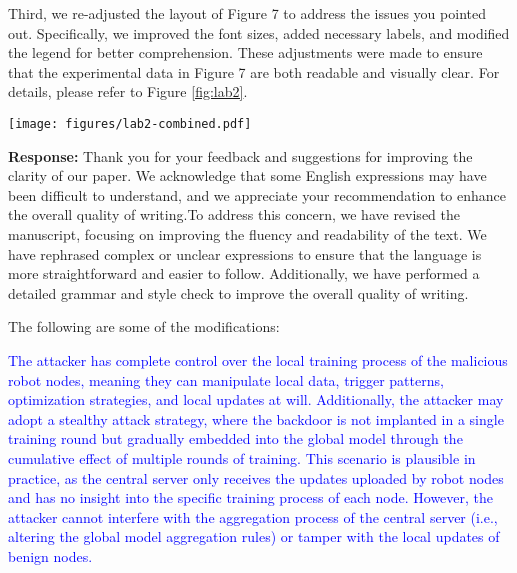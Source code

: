 \documentclass[a4paper,twoside,11pt,dvipsnames]{reviewresponse}
\begin{document}
Third, we re-adjusted the layout of Figure 7 to address the issues you pointed out. Specifically, we improved the font sizes, added necessary labels, and modified the legend for better comprehension. These adjustments were made to ensure that the experimental data in Figure 7 are both readable and visually clear. For details, please refer to Figure \ref{fig:lab2}.

\begin{figure*}[!h]
    \centering
    \texttt{[image: figures/lab2-combined.pdf]}
    \caption{Visualization of node identification results under three attack scenarios (MR, EDGE CASE, NEUR) for four defense mechanisms (SecFFT, Flame, FLTrust, FoolsGold) using t-SNE. The red dots represent misidentified nodes, including both malicious nodes incorrectly identified as benign, or vice versa. }
    \label{fig:lab2}
\end{figure*}



\textbf{Response:} 
Thank you for your feedback and suggestions for improving the clarity of our paper. We acknowledge that some English expressions may have been difficult to understand, and we appreciate your recommendation to enhance the overall quality of writing.To address this concern, we have revised the manuscript, focusing on improving the fluency and readability of the text. We have rephrased complex or unclear expressions to ensure that the language is more straightforward and easier to follow. Additionally, we have performed a detailed grammar and style check to improve the overall quality of writing.

The following are some of the modifications:

\textcolor{blue}{The attacker has complete control over the local training process of the malicious robot nodes, meaning they can manipulate local data, trigger patterns, optimization strategies, and local updates at will. Additionally, the attacker may adopt a stealthy attack strategy, where the backdoor is not implanted in a single training round but gradually embedded into the global model through the cumulative effect of multiple rounds of training. This scenario is plausible in practice, as the central server only receives the updates uploaded by robot nodes and has no insight into the specific training process of each node. However, the attacker cannot interfere with the aggregation process of the central server (i.e., altering the global model aggregation rules) or tamper with the local updates of benign nodes.}
\end{document}
